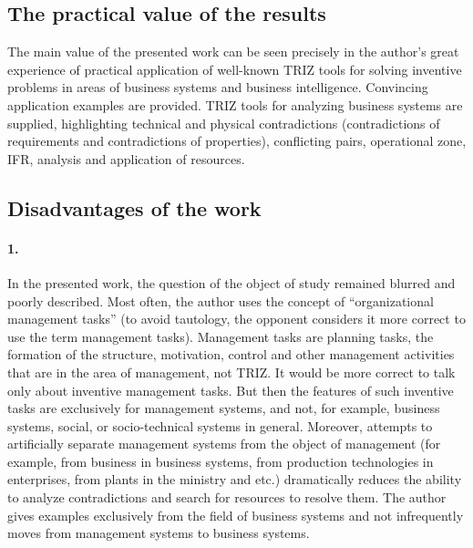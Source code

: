 \documentclass[11pt,a4paper]{article}
\begin{document}
\subsection*{The practical value of the results}
The main value of the presented work can be seen precisely in the author’s
great experience of practical application of well-known TRIZ tools for solving
inventive problems in areas of business systems and business intelligence.
Convincing application examples are provided.  TRIZ tools for analyzing
business systems are supplied, highlighting technical and physical
contradictions (contradictions of requirements and contradictions of
properties), conflicting pairs, operational zone, IFR, analysis and
application of resources.

\subsection*{Disadvantages of the work}

\paragraph{1.}
In the presented work, the question of the object of study remained blurred
and poorly described.  Most often, the author uses the concept of
“organizational management tasks” (to avoid tautology, the opponent considers
it more correct to use the term management tasks). Management tasks are
planning tasks, the formation of the structure, motivation, control and other
management activities that are in the area of management, not TRIZ. It would
be more correct to talk only about inventive management tasks. But then the
features of such inventive tasks are exclusively for management systems, and
not, for example, business systems, social, or socio-technical systems in
general.  Moreover, attempts to artificially separate management systems from
the object of management (for example, from business in business systems, from
production technologies in enterprises, from plants in the ministry and etc.)
dramatically reduces the ability to analyze contradictions and search for
resources to resolve them. The author gives examples exclusively from the
field of business systems and not infrequently moves from management systems
to business systems.
\end{document}
